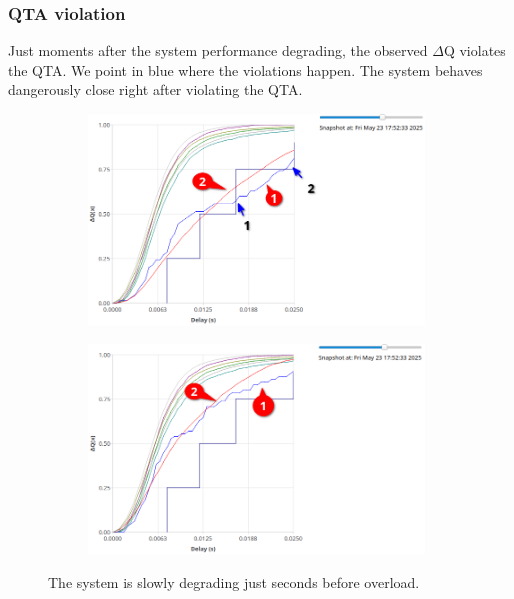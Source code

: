         \subsubsection{QTA violation}
            Just moments after the system performance degrading, the observed $\Delta$Q violates the QTA. We point in blue where the violations happen. The system behaves dangerously close right after violating the QTA.
             \begin{figure}[H]
            \centering
            \begin{subfigure}{.5\textwidth}
                \centering
                \includegraphics[width=0.98\textwidth]{img/violation1.png}
                \label{fig:appr_ov_2}
            \end{subfigure}%
            \begin{subfigure}{.5\textwidth}
                \centering
                \includegraphics[width =0.98\textwidth]{img/right_after1.png}
                \label{fig:appr_ov}
            \end{subfigure}
            \label{fig:appr_ov_t}
            \caption{The system is slowly degrading just seconds before overload.}
            \end{figure}
 

